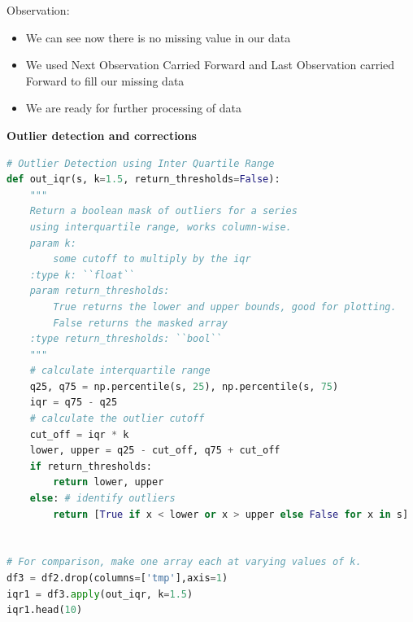 Observation:
\begin{itemize}
    \item We can see now there is no missing value in our data
\item We used Next Observation Carried Forward and Last Observation carried Forward to fill our missing data
\item We are ready for further processing of data
\end{itemize}

\vspace{50mm}

\hspace{10mm}\textbf{Outlier detection and corrections}\\

\begin{lstlisting}[language=Python]
# Outlier Detection using Inter Quartile Range
def out_iqr(s, k=1.5, return_thresholds=False):
    """
    Return a boolean mask of outliers for a series
    using interquartile range, works column-wise.
    param k:
        some cutoff to multiply by the iqr
    :type k: ``float``
    param return_thresholds:
        True returns the lower and upper bounds, good for plotting.
        False returns the masked array 
    :type return_thresholds: ``bool``
    """
    # calculate interquartile range
    q25, q75 = np.percentile(s, 25), np.percentile(s, 75)
    iqr = q75 - q25
    # calculate the outlier cutoff
    cut_off = iqr * k
    lower, upper = q25 - cut_off, q75 + cut_off
    if return_thresholds:
        return lower, upper
    else: # identify outliers
        return [True if x < lower or x > upper else False for x in s]
    
    
# For comparison, make one array each at varying values of k.
df3 = df2.drop(columns=['tmp'],axis=1)
iqr1 = df3.apply(out_iqr, k=1.5)
iqr1.head(10)
\end{lstlisting}

